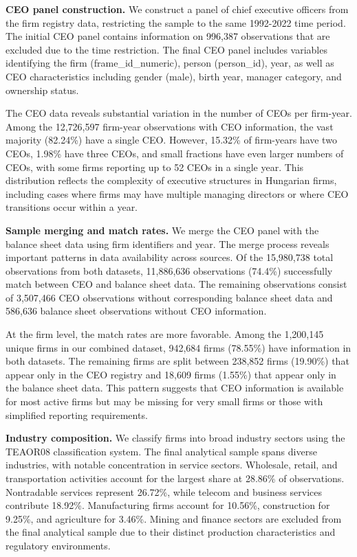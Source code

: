 \documentclass[11pt,a4paper]{article}
\begin{document}
\textbf{CEO panel construction.} We construct a panel of chief executive officers from the firm registry data, restricting the sample to the same 1992-2022 time period. The initial CEO panel contains information on 996,387 observations that are excluded due to the time restriction. The final CEO panel includes variables identifying the firm (frame\_id\_numeric), person (person\_id), year, as well as CEO characteristics including gender (male), birth year, manager category, and ownership status.

The CEO data reveals substantial variation in the number of CEOs per firm-year. Among the 12,726,597 firm-year observations with CEO information, the vast majority (82.24\%) have a single CEO. However, 15.32\% of firm-years have two CEOs, 1.98\% have three CEOs, and small fractions have even larger numbers of CEOs, with some firms reporting up to 52 CEOs in a single year. This distribution reflects the complexity of executive structures in Hungarian firms, including cases where firms may have multiple managing directors or where CEO transitions occur within a year.

\textbf{Sample merging and match rates.} We merge the CEO panel with the balance sheet data using firm identifiers and year. The merge process reveals important patterns in data availability across sources. Of the 15,980,738 total observations from both datasets, 11,886,636 observations (74.4\%) successfully match between CEO and balance sheet data. The remaining observations consist of 3,507,466 CEO observations without corresponding balance sheet data and 586,636 balance sheet observations without CEO information.

At the firm level, the match rates are more favorable. Among the 1,200,145 unique firms in our combined dataset, 942,684 firms (78.55\%) have information in both datasets. The remaining firms are split between 238,852 firms (19.90\%) that appear only in the CEO registry and 18,609 firms (1.55\%) that appear only in the balance sheet data. This pattern suggests that CEO information is available for most active firms but may be missing for very small firms or those with simplified reporting requirements.

\textbf{Industry composition.} We classify firms into broad industry sectors using the TEAOR08 classification system. The final analytical sample spans diverse industries, with notable concentration in service sectors. Wholesale, retail, and transportation activities account for the largest share at 28.86\% of observations. Nontradable services represent 26.72\%, while telecom and business services contribute 18.92\%. Manufacturing firms account for 10.56\%, construction for 9.25\%, and agriculture for 3.46\%. Mining and finance sectors are excluded from the final analytical sample due to their distinct production characteristics and regulatory environments.
\end{document}
